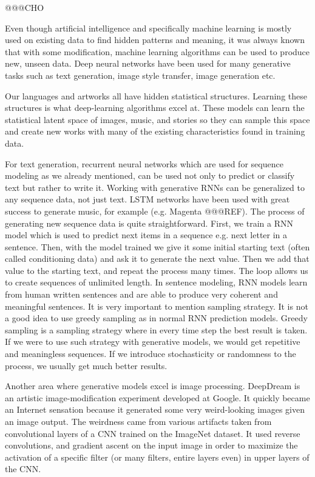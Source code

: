 \documentclass[b5paper]{book}
\begin{document}
@@@CHO

Even though artificial intelligence and specifically machine learning is mostly used on existing data to find hidden patterns and meaning, it was always known that with some modification, machine learning algorithms can be used to produce new, unseen data. Deep neural networks have been used for many generative tasks such as text generation, image style transfer, image generation etc.

Our languages and artworks all have hidden statistical structures. Learning these structures is what deep-learning algorithms excel at. These models can learn the statistical latent space of images, music, and stories so they can sample this space and create new works with many of the existing characteristics found in training data.

For text generation, recurrent neural networks which are used for sequence modeling as we already mentioned, can be used not only to predict or classify text but rather to write it. Working with generative RNNs can be generalized to any sequence data, not just text. LSTM networks have been used with great success to generate music, for example (e.g. Magenta @@@REF). The process of generating new sequence data is quite straightforward. First, we train a RNN model which is used to predict next items in a sequence e.g. next letter in a sentence. Then, with the model trained we give it some initial starting text (often called conditioning data) and ask it to generate the next value. Then we add that value to the starting text, and repeat the process many times. The loop allows us to create sequences of unlimited length. In sentence modeling, RNN models learn from human written sentences and are able to produce very coherent and meaningful sentences. It is very important to mention sampling strategy. It is not a good idea to use greedy sampling as in normal RNN prediction models. Greedy sampling is a sampling strategy where in every time step the best result is taken. If we were to use such strategy with generative models, we would get repetitive and meaningless sequences. If we introduce stochasticity or randomness to the process, we usually get much better results.

Another area where generative models excel is image processing. DeepDream is an artistic image-modification experiment developed at Google. It quickly became an Internet sensation because it generated some very weird-looking images given an image output. The weirdness came from various artifacts taken from convolutional layers of a CNN trained on the ImageNet dataset. It used reverse convolutions, and gradient ascent on the input image in order to maximize the activation of a specific filter (or many filters, entire layers even) in upper layers of the CNN.
\end{document}
